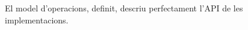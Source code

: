 
El model d'operacions, definit, descriu perfectament l'API de les
implementacions.






















